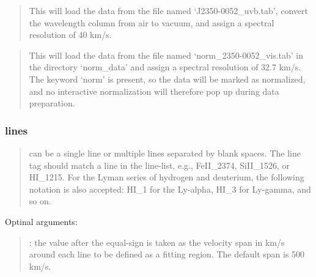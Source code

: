 \documentclass[letterpaper,10pt,english]{sphinxmanual}
\begin{document}
\begin{sphinxShadowBox}

\begin{quote}

This will load the data from the file named ‘J2350-0052\_uvb.tab’,
convert the wavelength column from air to vacuum, and assign
a spectral resolution of 40 km/s.
\end{quote}

\begin{quote}

This will load the data from the file named ‘norm\_2350-0052\_vis.tab’
in the directory ‘norm\_data’ and assign a spectral resolution of 32.7 km/s.
The keyword ‘norm’ is present, so the data will be marked as normalized,
and no interactive normalization will therefore pop up during data preparation.
\end{quote}
\end{sphinxShadowBox}


\subsubsection{lines}
\label{\detokenize{documentation:lines}}
\begin{quote}

 can be a single line or multiple lines separated by blank spaces.
The line tag should match a line in the line-list, e.g., FeII\_2374, SiII\_1526,
or HI\_1215. For the Lyman series of hydrogen and deuterium, the following
notation is also accepted: HI\_1 for the Ly-alpha, HI\_3 for Ly-gamma, and so on.
\end{quote}

Optinal arguments:
\begin{quote}

 : the value after the equal-sign is taken as the velocity
span in km/s around each line to be defined as a fitting region.
The default span is 500 km/s.
\end{quote}
\end{document}
